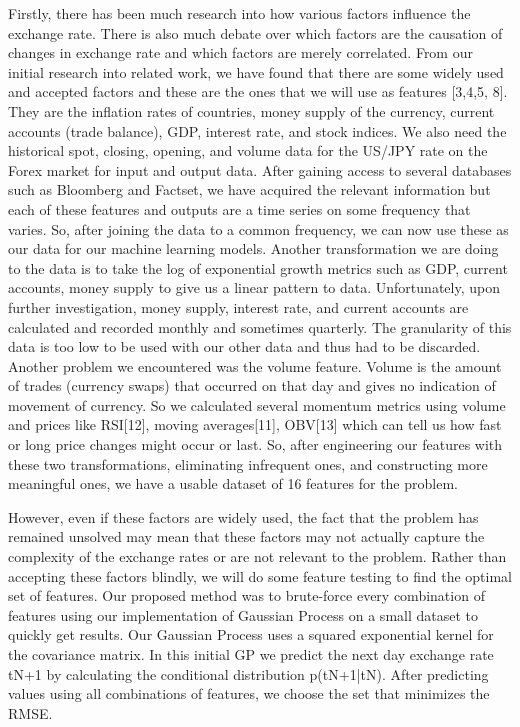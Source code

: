 \documentclass[twoside]{article}
\begin{document}
Firstly, there has been much research into how various factors influence the exchange rate. There is also much debate over which factors are the causation of changes in exchange rate and which factors are merely correlated. From our initial research into related work, we have found that there are some widely ­used and accepted factors and these are the ones that we will use as features [3,4,5, 8]. They are the inflation rates of countries, money supply of the currency, current accounts (trade balance), GDP, interest rate, and stock indices. We also need the historical spot, closing, opening, and volume data for the US/JPY rate on the Forex market for input and output data. After gaining access to several databases such as Bloomberg and Factset, we have acquired the relevant information but each of these features and outputs are a time series on some frequency that varies. So, after joining the data to a common frequency, we can now use these as our data for our machine learning models. Another transformation we are doing to the data is to take the log of exponential growth metrics such as GDP, current accounts, money supply to give us a linear pattern to data. Unfortunately, upon further investigation, money supply, interest rate, and current accounts are calculated and recorded monthly and sometimes quarterly. The granularity of this data is too low to be used with our other data and thus had to be discarded. Another problem we encountered was the volume feature. Volume is the amount of trades (currency swaps) that occurred on that day and gives no indication of movement of currency. So we calculated several momentum metrics using volume and prices like RSI[12], moving averages[11], OBV[13] which can tell us how fast or long price changes might occur or last. So, after engineering our features with these two transformations, eliminating infrequent ones, and constructing more meaningful ones, we have a usable dataset of 16 features for the problem.

However, even if these factors are widely­ used, the fact that the problem has remained unsolved may mean that these factors may not actually capture the complexity of the exchange rates or are not relevant to the problem. Rather than accepting these factors blindly, we will do some feature testing to find the optimal set of features. Our proposed method was to brute-force every combination of features using our implementation of Gaussian Process on a small dataset to quickly get results. Our Gaussian Process uses a squared exponential kernel for the covariance matrix. In this initial GP we predict the next day exchange rate tN+1 by calculating the conditional distribution p(tN+1|tN). After predicting values using all combinations of features, we choose the set that minimizes the RMSE.
 
\end{document}
